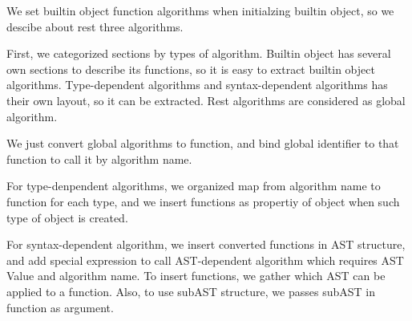  We set builtin object function algorithms when initialzing builtin object, so we descibe about rest three algorithms. 
  
First, we categorized sections by types of algorithm. Builtin object has several own sections to describe its functions,
so it is easy to extract builtin object algorithms. Type-dependent algorithms and syntax-dependent algorithms has their own layout, so it
can be extracted. Rest algorithms are considered as global algorithm.

We just convert global algorithms to function, and bind global identifier to that function to call it by algorithm name.

For type-denpendent algorithms, we organized map from algorithm name to function for each type,
 and we insert functions as propertiy of object when such type of object is created.

For syntax-dependent algorithm, we insert converted functions in AST structure, and add special expression to call AST-dependent algorithm which requires AST Value and algorithm name.
To insert functions, we gather which AST can be applied to a function. Also, to use subAST structure, we passes subAST in function as argument.


